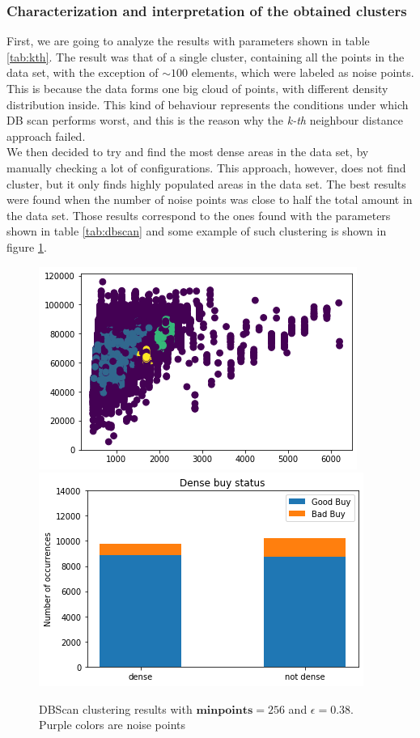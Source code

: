 \documentclass{article}
\begin{document}
	\subsubsection{Characterization and interpretation of the obtained clusters}
	\label{sec:dbscaneval}
	First, we are going to analyze the results with parameters shown in table \ref{tab:kth}. The result was that of a single cluster, containing all the points in the data set, with the exception of $\sim 100$ elements, which were labeled as noise points. This is because the data forms one big cloud of points, with different density distribution inside. This kind of behaviour represents the conditions under which DB scan performs worst, and this is the reason why the \emph{k-th} neighbour distance approach failed. \\
	We then decided to try and find the most dense areas in the data set, by manually checking a lot of configurations. This approach, however, does not find cluster, but it only finds highly populated areas in the data set. 
	The best results were found when the number of noise points was close to half the total amount in the data set. Those results correspond to the ones found with the parameters shown in table \ref{tab:dbscan} and some example of such clustering is shown in figure \ref{fig:dbscan}.
	
	\begin{figure}[H] 
		\centering
		\includegraphics[width=.48\textwidth]{cazzo}\hfill
		\includegraphics[width=.49\textwidth]{bigboi}\hfill
		\caption{DBScan clustering results with $\mathbf{minpoints} = 256$ and $\epsilon = 0.38$. Purple colors are noise points}
		\label{fig:dbscan}
	\end{figure}
	
\end{document}
